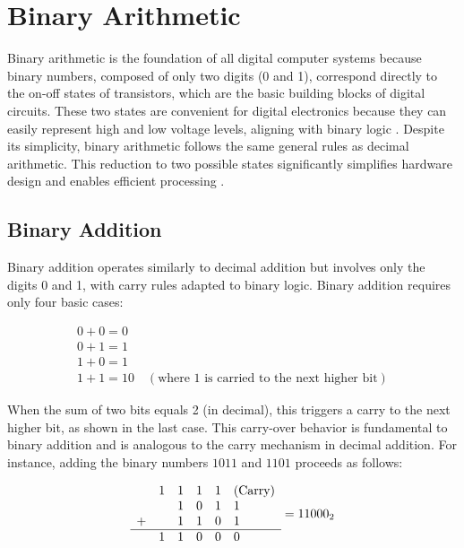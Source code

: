 \section{Binary Arithmetic}
Binary arithmetic is the foundation of all digital computer systems because binary numbers, composed of only two digits (0 and 1), correspond directly to the on-off states of transistors, which are the basic building blocks of digital circuits. These two states are convenient for digital electronics because they can easily represent high and low voltage levels, aligning with binary logic \cite{knuth1997}. Despite its simplicity, binary arithmetic follows the same general rules as decimal arithmetic. This reduction to two possible states significantly simplifies hardware design and enables efficient processing \cite{rosen2018}.

\subsection{Binary Addition}
Binary addition operates similarly to decimal addition but involves only the digits 0 and 1, with carry rules adapted to binary logic. Binary addition requires only four basic cases:

\[
\begin{array}{l}
    0 + 0 = 0 \\
    0 + 1 = 1 \\
    1 + 0 = 1 \\
    1 + 1 = 10 \quad (\text{where 1 is carried to the next higher bit})
\end{array}
\]

When the sum of two bits equals 2 (in decimal), this triggers a carry to the next higher bit, as shown in the last case. This carry-over behavior is fundamental to binary addition and is analogous to the carry mechanism in decimal addition. For instance, adding the binary numbers \( 1011 \) and \( 1101 \) proceeds as follows:

\[
\begin{array}{cccccl}
  & 1& 1 & 1 & 1 &     (\text{Carry}) \\ %
  &  & 1 & 0 & 1 & 1    \\ %
+ &  & 1 & 1 & 0 & 1    \\ %
  \hline
  & 1 & 1 & 0 & 0 & 0    \\ %
\end{array} = 11000_2
\]

